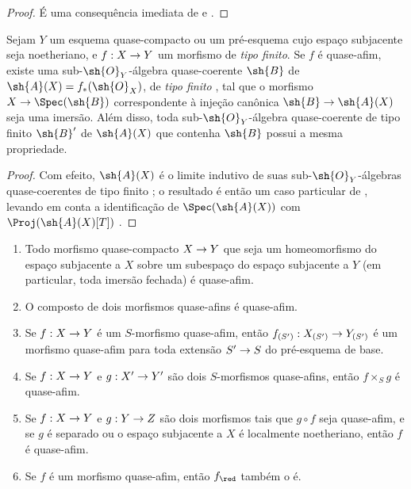 \documentclass[oneside,10pt]{amsart}
\makeatletter
\newcommand{\ega@arrow}[2]{\mathchoice{#1}{#2}{#2}{#2}}
\renewcommand{\to}{\ega@arrow{\longrightarrow}{\rightarrow}}
\let\EGAOriginalLabel\label
\renewcommand{\label}[1]{\phantomsection\EGAOriginalLabel{#1}}
\makeatother
\begin{document}
\begin{proof}
É uma consequência imediata de  e .
\end{proof}

\begin{corollary}[5.1.9]
\label{II.5.1.9}
Sejam $Y$ um esquema quase-compacto ou um pré-esquema cujo espaço subjacente seja noetheriano, e $f:X\to Y$ um morfismo de \emph{tipo finito}.
Se $f$ é quase-afim, existe uma sub-$\sh{O}_Y$-álgebra quase-coerente $\sh{B}$ de $\sh{A}(X)=f_*(\sh{O}_X)$, de \emph{tipo finito} , tal que o morfismo $X\to\Spec(\sh{B})$ correspondente à injeção canônica $\sh{B}\to\sh{A}(X)$  seja uma imersão.
Além disso, toda sub-$\sh{O}_Y$-álgebra quase-coerente de tipo finito $\sh{B}'$ de $\sh{A}(X)$ que contenha $\sh{B}$ possui a mesma propriedade.
\end{corollary}

\begin{proof}
Com efeito, $\sh{A}(X)$ é o limite indutivo de suas sub-$\sh{O}_Y$-álgebras quase-coerentes de tipo finito ;
o resultado é então um caso particular de , levando em conta a identificação de $\Spec(\sh{A}(X))$ com $\Proj(\sh{A}(X)[T])$ .
\end{proof}

\begin{proposition}[5.1.10]
\label{II.5.1.10}
\medskip\noindent
\begin{enumerate}
  \item[{\rm(i)}] Todo morfismo quase-compacto $X\to Y$ que seja um homeomorfismo do espaço subjacente a $X$ sobre um subespaço do espaço subjacente a $Y$ (em particular, toda imersão fechada) é quase-afim.
  \item[{\rm(ii)}] O composto de dois morfismos quase-afins é quase-afim.
  \item[{\rm(iii)}] Se $f:X\to Y$ é um $S$-morfismo quase-afim, então $f_{(S')}:X_{(S')}\to Y_{(S')}$ é um morfismo quase-afim para toda extensão $S'\to S$ do pré-esquema de base.
  \item[{\rm(iv)}] Se $f:X\to Y$ e $g:X'\to Y'$ são dois $S$-morfismos quase-afins, então $f\times_S g$ é quase-afim.
  \item[{\rm(v)}] Se $f:X\to Y$ e $g:Y\to Z$ são dois morfismos tais que $g\circ f$ seja quase-afim, e se $g$ é separado ou o espaço subjacente a $X$ é localmente noetheriano, então $f$ é quase-afim.
  \item[{\rm(vi)}] Se $f$ é um morfismo quase-afim, então $f_\red$ também o é.
\end{enumerate}
\end{proposition}
\end{document}
